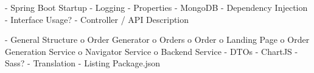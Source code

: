 -	Spring Boot Startup 
-	Logging
-	Properties
-	MongoDB 
-	Dependency Injection
-	Interface Usage?
-	Controller / API Description

-	General Structure
o	Order Generator
o	Orders
o	Order
o	Landing Page
o	Order Generation Service
o	Navigator Service
o	Backend Service
-	DTOs
-	ChartJS
-	Sass?
-	Translation
-	Listing Package.json

